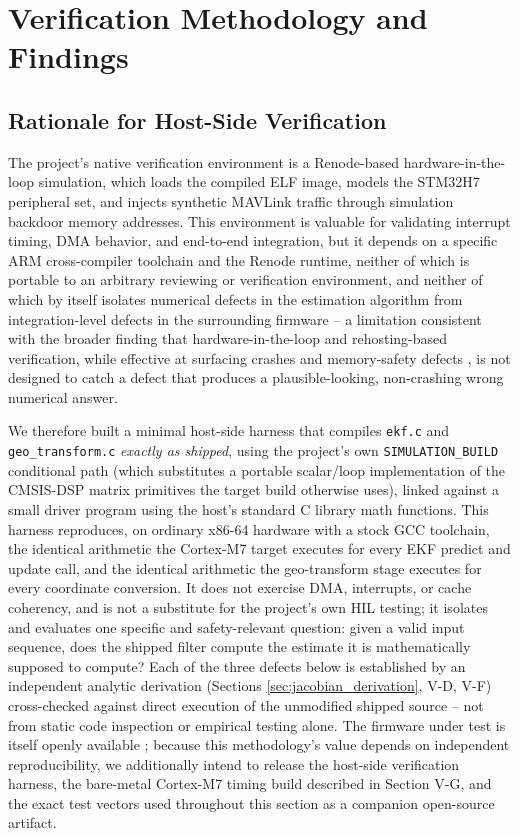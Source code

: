 \documentclass[conference]{IEEEtran}
\begin{document}
\section{Verification Methodology and Findings}

\subsection{Rationale for Host-Side Verification}

The project's native verification environment is a Renode-based \cite{r6} hardware-in-the-loop simulation, which loads the compiled ELF image, models the STM32H7 peripheral set, and injects synthetic MAVLink traffic \cite{r5} through simulation backdoor memory addresses. This environment is valuable for validating interrupt timing, DMA behavior, and end-to-end integration, but it depends on a specific ARM cross-compiler toolchain and the Renode runtime, neither of which is portable to an arbitrary reviewing or verification environment, and neither of which by itself isolates numerical defects in the estimation algorithm from integration-level defects in the surrounding firmware -- a limitation consistent with the broader finding that hardware-in-the-loop and rehosting-based verification, while effective at surfacing crashes and memory-safety defects \cite{r19}, is not designed to catch a defect that produces a plausible-looking, non-crashing wrong numerical answer.

We therefore built a minimal host-side harness that compiles \texttt{ekf.c} and \texttt{geo\_transform.c} \emph{exactly as shipped}, using the project's own \texttt{SIMULATION\_BUILD} conditional path (which substitutes a portable scalar/loop implementation of the CMSIS-DSP matrix primitives the target build otherwise uses), linked against a small driver program using the host's standard C library math functions. This harness reproduces, on ordinary x86-64 hardware with a stock GCC toolchain, the identical arithmetic the Cortex-M7 target executes for every EKF predict and update call, and the identical arithmetic the geo-transform stage executes for every coordinate conversion. It does not exercise DMA, interrupts, or cache coherency, and is not a substitute for the project's own HIL testing; it isolates and evaluates one specific and safety-relevant question: given a valid input sequence, does the shipped filter compute the estimate it is mathematically supposed to compute? Each of the three defects below is established by an independent analytic derivation (Sections \ref{sec:jacobian_derivation}, V-D, V-F) cross-checked against direct execution of the unmodified shipped source -- not from static code inspection or empirical testing alone. The firmware under test is itself openly available \cite{r20}; because this methodology's value depends on independent reproducibility, we additionally intend to release the host-side verification harness, the bare-metal Cortex-M7 timing build described in Section V-G, and the exact test vectors used throughout this section as a companion open-source artifact.
\end{document}
